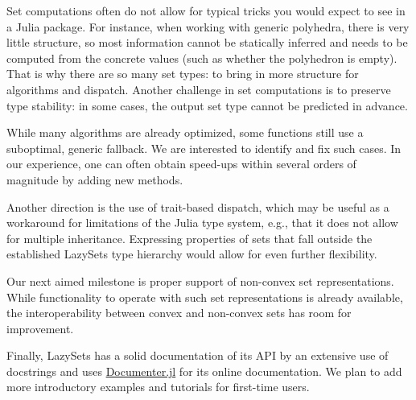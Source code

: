 Set computations often do not allow for typical tricks you would expect to see in a Julia package. For instance, when working with generic polyhedra, there is very little structure, so most information cannot be statically inferred and needs to be computed from the concrete values (such as whether the polyhedron is empty). That is why there are so many set types: to bring in more structure for algorithms and dispatch.
%
Another challenge in set computations is to preserve type stability: in some cases, the output set type cannot be predicted in advance.

\smallskip

While many algorithms are already optimized, some functions still use a suboptimal, generic fallback.
%
We are interested to identify and fix such cases.
%
In our experience, one can often obtain speed-ups within several orders of magnitude by adding new methods.

\smallskip

Another direction is the use of trait-based dispatch, which may be useful as a workaround for limitations of the Julia type system, e.g., that it does not allow for multiple inheritance.
%
Expressing properties of sets that fall outside the established LazySets type hierarchy would allow for even further flexibility.

\smallskip

Our next aimed milestone is proper support of non-convex set representations. While functionality to operate with such set representations is already available, the interoperability between convex and non-convex sets has room for improvement.

\smallskip

Finally, LazySets has a solid documentation of its API by an extensive use of docstrings and uses \href{https://github.com/JuliaDocs/Documenter.jl}{Documenter.jl} for its online documentation.
%
We plan to add more introductory examples and tutorials for first-time users.

